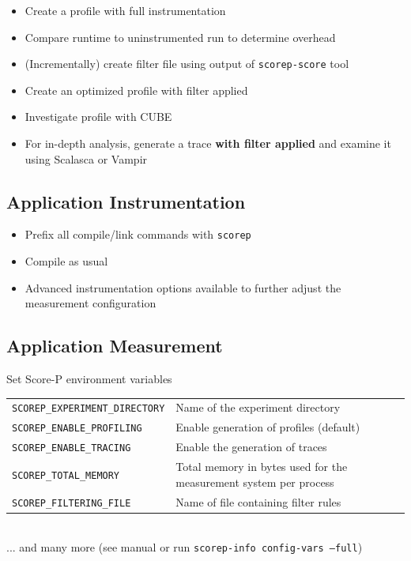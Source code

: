 \begin{itemize}
\itemsep0.1em
\item  Create a profile with full instrumentation
\item  Compare runtime to uninstrumented run to determine overhead
\item  (Incrementally) create filter file using output of
      \texttt{scorep-score} tool
\item  Create an optimized profile with filter applied
\item  Investigate profile with CUBE
\item  For in-depth analysis, generate a trace \textbf{with filter applied}
      and examine it using Scalasca or Vampir
\end{itemize}


\subsection{Application Instrumentation}
\begin{itemize}
\itemsep0.1em
\item Prefix all compile/link commands with \texttt{scorep}\\
\item Compile as usual\\
\item Advanced instrumentation options available to further adjust the measurement configuration
\end{itemize}
\subsection{Application Measurement}
Set Score-P environment variables\\[1ex]
\begin{tabular}{@{}l@{ }l@{ }}
\texttt{SCOREP\_EXPERIMENT\_DIRECTORY} & Name of the experiment directory\\
\texttt{SCOREP\_ENABLE\_PROFILING} & Enable generation of profiles (default)\\
\texttt{SCOREP\_ENABLE\_TRACING} & Enable the generation of traces\\
\texttt{SCOREP\_TOTAL\_MEMORY} & Total memory in bytes used for the measurement system per process\\
\texttt{SCOREP\_FILTERING\_FILE} & Name of file containing filter rules\\
\end{tabular}\\[1ex]
... and many more (see manual or run \texttt{scorep-info config-vars ---full})\\

